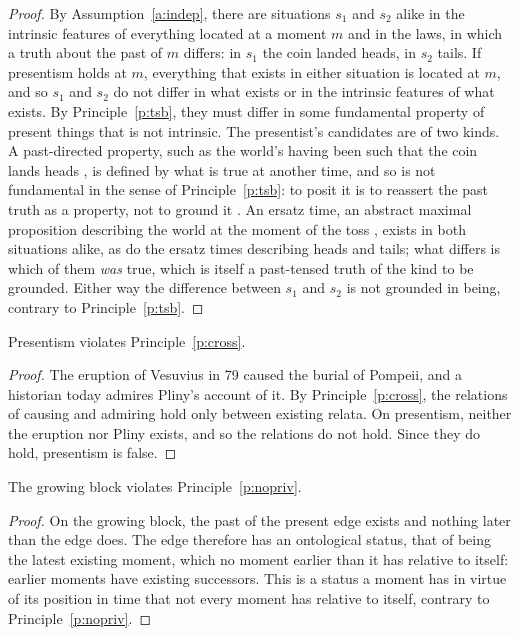 \documentclass{situationist-preprint}
\begin{document}
\begin{proof}
By Assumption~\ref{a:indep}, there are situations $s_1$ and $s_2$ alike in the intrinsic features of everything located at a moment $m$ and in the laws, in which a truth about the past of $m$ differs: in $s_1$ the coin landed heads, in $s_2$ tails. If presentism holds at $m$, everything that exists in either situation is located at $m$, and so $s_1$ and $s_2$ do not differ in what exists or in the intrinsic features of what exists. By Principle~\ref{p:tsb}, they must differ in some fundamental property of present things that is not intrinsic. The presentist's candidates are of two kinds. A past-directed property, such as the world's having been such that the coin lands heads \citep{Bigelow1996}, is defined by what is true at another time, and so is not fundamental in the sense of Principle~\ref{p:tsb}: to posit it is to reassert the past truth as a property, not to ground it \citep{Sider2001}. An ersatz time, an abstract maximal proposition describing the world at the moment of the toss \citep{Crisp2007}, exists in both situations alike, as do the ersatz times describing heads and tails; what differs is which of them \emph{was} true, which is itself a past-tensed truth of the kind to be grounded. Either way the difference between $s_1$ and $s_2$ is not grounded in being, contrary to Principle~\ref{p:tsb}.
\end{proof}

\begin{lemma}\label{l:cross}
Presentism violates Principle~\ref{p:cross}.
\end{lemma}

\begin{proof}
The eruption of Vesuvius in 79 caused the burial of Pompeii, and a historian today admires Pliny's account of it. By Principle~\ref{p:cross}, the relations of causing and admiring hold only between existing relata. On presentism, neither the eruption nor Pliny exists, and so the relations do not hold. Since they do hold, presentism is false.
\end{proof}

\begin{lemma}\label{l:block}
The growing block violates Principle~\ref{p:nopriv}.
\end{lemma}

\begin{proof}
On the growing block, the past of the present edge exists and nothing later than the edge does. The edge therefore has an ontological status, that of being the latest existing moment, which no moment earlier than it has relative to itself: earlier moments have existing successors. This is a status a moment has in virtue of its position in time that not every moment has relative to itself, contrary to Principle~\ref{p:nopriv}.
\end{proof}
\end{document}
